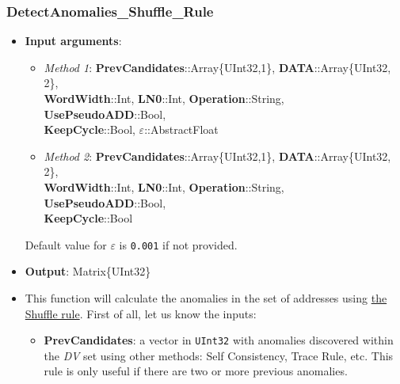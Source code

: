 \subsubsection*{DetectAnomalies\_Shuffle\_Rule}\label{Fun:DetectAnomaliesShuffleRule}
 \begin{itemize}
 	\item \textbf{Input arguments}: 
 		\begin{itemize}
		\item \textit{Method 1}:
			\textbf{PrevCandidates}::Array\{UInt32,1\}, \textbf{DATA}::Array\{UInt32, 2\}, \\ \textbf{WordWidth}::Int, \textbf{LN0}::Int,  \textbf{Operation}::String, \textbf{UsePseudoADD}::Bool, \\  \textbf{KeepCycle}::Bool, \textbf{\(\varepsilon\)}::AbstractFloat
		\item \textit{Method 2}: 			%
			\textbf{PrevCandidates}::Array\{UInt32,1\}, \textbf{DATA}::Array\{UInt32, 2\}, \\ \textbf{WordWidth}::Int, \textbf{LN0}::Int,  \textbf{Operation}::String, \textbf{UsePseudoADD}::Bool, \\ \textbf{KeepCycle}::Bool
 		\end{itemize}
 		Default value for \textbf{\(\varepsilon\)} is \texttt{0.001} if not provided.
 		\item \textbf{Output}: Matrix\{UInt32\}
 		\item This function will calculate the anomalies in the set of addresses using \hyperref[Subsec:ShuffleRule]{the Shuffle rule}. 
 		First of all, let us know the inputs:
 		\begin{itemize}
 			
 			\item \textbf{PrevCandidates}: a vector in \texttt{UInt32} with anomalies discovered within the \textit{DV} set using other methods: Self Consistency, Trace Rule, etc. This rule is only useful if there are two or more previous anomalies. 
 			

\end{itemize}
\end{itemize}
